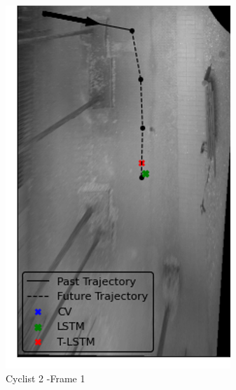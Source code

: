 \documentclass{article}
\begin{document}
\begin{figure}[H]
\centering
\begin{subfigure}{0.4\textwidth}
  \centering
  \includegraphics[width=\linewidth]{quali_results/cyc-3-1.png}
  \caption{Cyclist 2 -Frame 1}
  \label{fig:cyc2-1}
\end{subfigure}
\begin{subfigure}{0.4\textwidth}
  \centering

\end{subfigure}
\end{figure}
\end{document}
